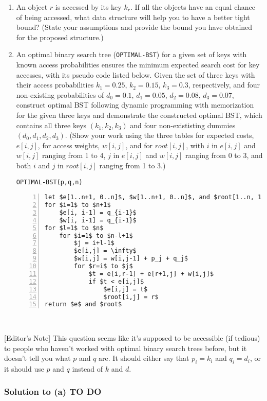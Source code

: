 	\begin{enumerate}[label=\alph*.]
		\item An object $r$ is accessed by its key $k_r$.  If all the objects have an equal chance of being accessed, what data structure will help you to have a better tight bound?  (State your assumptions and provide the bound you have obtained for the proposed structure.)
		\item An optimal binary search tree (\verb|OPTIMAL-BST|) for a given set of keys with known access probabilities ensures the minimum expected search cost for key accesses, with its pseudo code listed below.  Given the set of three keys with their access probabilities $k_1 = 0.25$, $k_2 = 0.15$, $k_3 = 0.3$, respectively, and four non-existing probabilities of $d_0 = 0.1$, $d_1 = 0.05$, $d_2 = 0.08$, $d_3 = 0.07$, construct optimal BST following dynamic programming with memorization for the given three keys and demonstrate the constructed optimal BST, which contains all three keys $(k_1, k_2, k_3)$ and four non-exististing dummies $(d_0, d_1, d_2, d_3)$.  (Show your work using the three tables for expected costs, $e[i,j]$, for access weights, $w[i,j]$, and for $root[i,j]$, with $i$ in $e[i,j]$ and $w[i,j]$ ranging from 1 to 4, $j$ in $e[i,j]$ and $w[i,j]$ ranging from 0 to 3, and both $i$ and $j$ in $root[i,j]$ ranging from 1 to 3.)
\

\verb|OPTIMAL-BST(p,q,n)|

\begin{lstlisting}[mathescape=true, numbers=left]
let $e[1..n+1, 0..n]$, $w[1..n+1, 0..n]$, and $root[1..n, 1..n]$ be new tables.
for $i=1$ to $n+1$
	$e[i, i-1] = q_{i-1}$
	$w[i, i-1] = q_{i-1}$
for $l=1$ to $n$
	for $i=1$ to $n-l+1$
		$j = i+l-1$
		$e[i,j] = \infty$
		$w[i,j] = w[i,j-1] + p_j + q_j$
		for $r=i$ to $j$
			$t = e[i,r-1] + e[r+1,j] + w[i,j]$
			if $t < e[i,j]$
				$e[i,j] = t$
				$root[i,j] = r$
return $e$ and $root$
\end{lstlisting}
\end{enumerate}

\

[Editor's Note] This question seems like it's supposed to be accessible (if tedious) to people who haven't worked with optimal binary search trees before, but it doesn't tell you what $p$ and $q$ are.  It should either say that $p_i = k_i$ and $q_i = d_i$, or it should use $p$ and $q$ instead of $k$ and $d$.  

\subsubsection{Solution to (a) TO DO}

